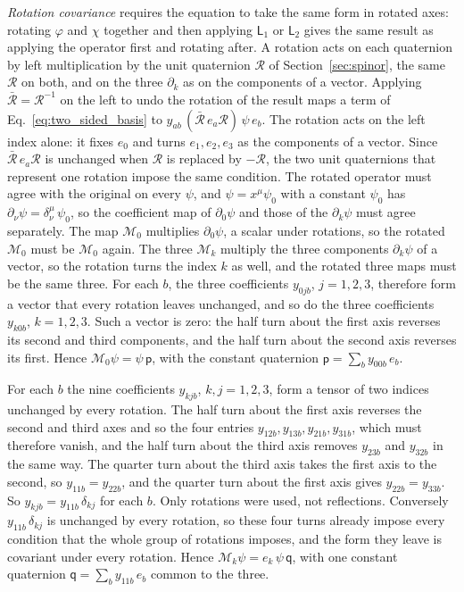 \documentclass[aps,prd,onecolumn,tightenlines,nofootinbib,notitlepage,11pt,floatfix]{revtex4-2}
\theoremstyle{indentedtheorem}
\begin{document}
\emph{Rotation covariance} requires the equation to take the same form in rotated axes: rotating $\varphi$ and $\chi$ together and then applying $\mathsf{L}_1$ or $\mathsf{L}_2$ gives the same result as applying the operator first and rotating after. A rotation acts on each quaternion by left multiplication by the unit quaternion $\mathcal{R}$ of Section~\ref{sec:spinor}, the same $\mathcal{R}$ on both, and on the three $\partial_k$ as on the components of a vector. Applying $\bar{\mathcal{R}}=\mathcal{R}^{-1}$ on the left to undo the rotation of the result maps a term of Eq.~\eqref{eq:two_sided_basis} to $y_{ab}\,(\bar{\mathcal{R}}\,e_a\mathcal{R})\,\psi\,e_b$. The rotation acts on the left index alone: it fixes $e_0$ and turns $e_1,e_2,e_3$ as the components of a vector. Since $\bar{\mathcal{R}}\,e_a\mathcal{R}$ is unchanged when $\mathcal{R}$ is replaced by $-\mathcal{R}$, the two unit quaternions that represent one rotation impose the same condition. The rotated operator must agree with the original on every $\psi$, and $\psi=x^\mu\psi_0$ with a constant $\psi_0$ has $\partial_\nu\psi=\delta^\mu_\nu\,\psi_0$, so the coefficient map of $\partial_0\psi$ and those of the $\partial_k\psi$ must agree separately. The map $\mathcal{M}_0$ multiplies $\partial_0\psi$, a scalar under rotations, so the rotated $\mathcal{M}_0$ must be $\mathcal{M}_0$ again. The three $\mathcal{M}_k$ multiply the three components $\partial_k\psi$ of a vector, so the rotation turns the index $k$ as well, and the rotated three maps must be the same three. For each $b$, the three coefficients $y_{0jb}$, $j=1,2,3$, therefore form a vector that every rotation leaves unchanged, and so do the three coefficients $y_{k0b}$, $k=1,2,3$. Such a vector is zero: the half turn about the first axis reverses its second and third components, and the half turn about the second axis reverses its first. Hence $\mathcal{M}_0\psi=\psi\,\mathsf{p}$, with the constant quaternion $\mathsf{p}=\sum_b y_{00b}\,e_b$.

For each $b$ the nine coefficients $y_{kjb}$, $k,j=1,2,3$, form a tensor of two indices unchanged by every rotation. The half turn about the first axis reverses the second and third axes and so the four entries $y_{12b},y_{13b},y_{21b},y_{31b}$, which must therefore vanish, and the half turn about the third axis removes $y_{23b}$ and $y_{32b}$ in the same way. The quarter turn about the third axis takes the first axis to the second, so $y_{11b}=y_{22b}$, and the quarter turn about the first axis gives $y_{22b}=y_{33b}$. So $y_{kjb}=y_{11b}\,\delta_{kj}$ for each $b$. Only rotations were used, not reflections. Conversely $y_{11b}\,\delta_{kj}$ is unchanged by every rotation, so these four turns already impose every condition that the whole group of rotations imposes, and the form they leave is covariant under every rotation. Hence $\mathcal{M}_k\psi=e_k\,\psi\,\mathsf{q}$, with one constant quaternion $\mathsf{q}=\sum_b y_{11b}\,e_b$ common to the three.
\end{document}
